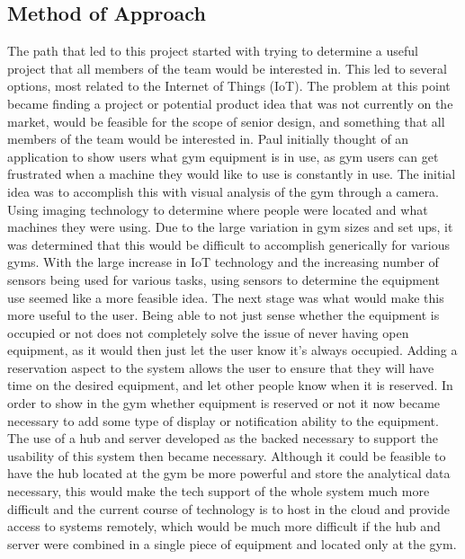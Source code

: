 \documentclass[ppfs.tex]{template/subfiles}
\begin{document}
	\subsection{Method of Approach}
	The path that led to this project started with trying to determine a useful project that all members of the team would be interested in. This led to several options, most related to the Internet of Things (IoT). The problem at this point became finding a project or potential product idea that was not currently on the market, would be feasible for the scope of senior design, and something that all members of the team would be interested in. Paul initially thought of an application to show users what gym equipment is in use, as gym users can get frustrated when a machine they would like to use is constantly in use. The initial idea was to accomplish this with visual analysis of the gym through a camera. Using imaging technology to determine where people were located and what machines they were using. Due to the large variation in gym sizes and set ups, it was determined that this would be difficult to accomplish generically for various gyms. With the large increase in IoT technology and the increasing number of sensors being used for various tasks, using sensors to determine the equipment use seemed like a more feasible idea. The next stage was what would make this more useful to the user. Being able to not just sense whether the equipment is occupied or not does not completely solve the issue of never having open equipment, as it would then just let the user know it's always occupied. Adding a reservation aspect to the system allows the user to ensure that they will have time on the desired equipment, and let other people know when it is reserved. In order to show in the gym whether equipment is reserved or not it now became necessary to add some type of display or notification ability to the equipment. The use of a hub and server developed as the backed necessary to support the usability of this system then became necessary. Although it could be feasible to have the hub located at the gym be more powerful and store the analytical data necessary, this would make the tech support of the whole system much more difficult and the current course of technology is to host in the cloud and provide access to systems remotely, which would be much more difficult if the hub and server were combined in a single piece of equipment and located only at the gym. 
	
\end{document}

